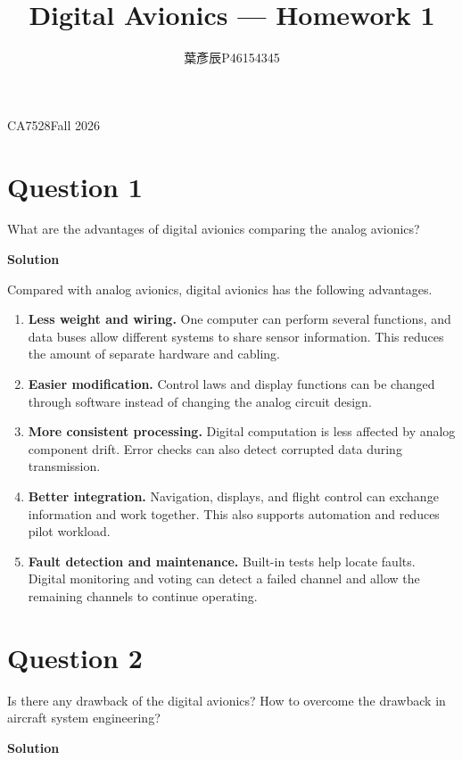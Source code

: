 \documentclass[12pt,a4paper]{article}
\title{Digital Avionics --- Homework 1}
\author{葉彥辰\quad P46154345}
\date{}
\begin{document}
\maketitle
\begin{center}CA7528\quad Fall 2026\end{center}

\section*{Question 1}
What are the advantages of digital avionics comparing the analog avionics?

\textbf{Solution}

Compared with analog avionics, digital avionics has the following advantages.
\begin{enumerate}
\item \textbf{Less weight and wiring.} One computer can perform several functions,
and data buses allow different systems to share sensor information. This reduces
the amount of separate hardware and cabling.
\item \textbf{Easier modification.} Control laws and display functions can be changed
through software instead of changing the analog circuit design.
\item \textbf{More consistent processing.} Digital computation is less affected by
analog component drift. Error checks can also detect corrupted data during transmission.
\item \textbf{Better integration.} Navigation, displays, and flight control can exchange
information and work together. This also supports automation and reduces pilot workload.
\item \textbf{Fault detection and maintenance.} Built-in tests help locate faults.
Digital monitoring and voting can detect a failed channel and allow the remaining
channels to continue operating.
\end{enumerate}

\newpage
\section*{Question 2}
Is there any drawback of the digital avionics? How to overcome the drawback in aircraft system engineering?

\textbf{Solution}
\end{document}
